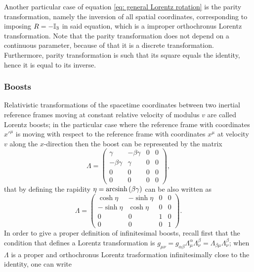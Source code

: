 Another particular case of equation \eqref{eq: general Lorentz rotation} is the parity transformation, namely the inversion of all spatial coordinates, corresponding to imposing $R = -\mathbb{I}_3$ in said equation, which is a improper orthochronus Lorentz transformation. Note that the parity transformation does not depend on a continuous parameter, because of that it is a discrete transformation. Furthermore, parity transformation is such that its square equals the identity, hence it is equal to its inverse.

\subsubsection{Boosts}
Relativistic transformations of the spacetime coordinates between two inertial reference frames moving at constant relative velocity of modulus $v$ are called Lorentz boosts; in the particular case where the reference frame with coordinates $x'^\mu$ is moving with respect to the reference frame with coordinates $x^\mu$ at velocity $v$ along the $x$-direction then the boost can be represented by the matrix
\begin{equation}
    \Lambda = 
    \begin{pmatrix}
        \gamma & -\beta\gamma & 0 & 0 \\
        -\beta\gamma & \gamma & 0 & 0 \\
        0 & 0 & 0 & 0 \\
        0 & 0 & 0 & 0
    \end{pmatrix},
\end{equation}
that by defining the rapidity $\eta = \operatorname{arcsinh}{(\beta\gamma)}$ can be also written as
\begin{equation}
\label{eq: Lorentz boost along x-axis (rapidity)}
    \Lambda = 
    \begin{pmatrix}
        \cosh{\eta} & -\sinh{\eta} & 0 & 0 \\
        -\sinh{\eta} & \cosh{\eta} & 0 & 0 \\
        0 & 0 & 1 & 0 \\
        0 & 0 & 0 & 1
    \end{pmatrix}.
\end{equation}
In order to give a proper definition of infinitesimal boosts, recall first that the condition that defines a Lorentz transformation is $g_{\mu\nu} = g_{\alpha\beta}\Lambda^\alpha_\mu\Lambda^\beta_\nu = \Lambda_{\beta\mu}\Lambda^\beta_\nu$; when $\Lambda$ is a proper and orthochronus Lorentz trasformation infinitesimally close to the identity, one can write
